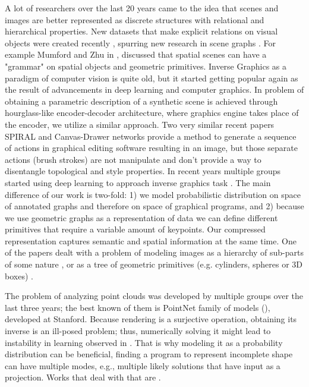 A lot of researchers over the last 20 years came to the idea that scenes and images are better represented as discrete structures with relational and hierarchical properties. 
New datasets that make explicit relations on visual objects were created recently \cite{krishna2017visual}, spurring new research in scene graphs \cite{DBLP:journals/corr/abs-1804-01622,Xu_2017_CVPR}.
For example Mumford and Zhu in \cite{zhu2006stochastic}, discussed that spatial scenes can have a "grammar" on spatial objects and geometric primitives.
Inverse Graphics as a paradigm of computer vision is quite old, but it started getting popular again as the result of advancements in deep learning and computer graphics. In \cite{wu2017neural} problem of obtaining a parametric description of a synthetic scene is achieved through hourglass-like encoder-decoder architecture, where graphics engine takes place of the encoder, we utilize a similar approach.
Two very similar recent papers SPIRAL \cite{pmlr-v80-ganin18a} and Canvas-Drawer networks \cite{frans2018unsupervised} provide a method to generate a sequence of actions in graphical editing software resulting in an image, but those separate actions (brush strokes) are not manipulate and don't provide a way to disentangle topological and style properties. 
In recent years multiple groups started using deep learning to approach inverse graphics task \cite{ellis2018learning,Tulsiani_2017_CVPR}.
The main difference of our work is two-fold: 1) we model probabilistic distribution on space of annotated graphs and therefore on space of graphical programs, and 2) because we use geometric graphs as a representation of data we can define different primitives that require a variable amount of keypoints. Our compressed representation captures semantic and spatial information at the same time.
One of the papers dealt with a problem of modeling images as a hierarchy of sub-parts of some nature  \cite{russell2009associative}, or as a tree of geometric primitives (e.g. cylinders, spheres or 3D boxes) \cite{li2017grass}.

The problem of analyzing point clouds was developed by multiple groups over the last three years; the best known of them is PointNet family of models (\cite{qi2016pointnet,qi2017pointnet++}), developed at Stanford.
Because rendering is a surjective operation, obtaining its inverse is an ill-posed problem; thus, numerically solving it might lead to instability in learning observed in \cite{tian2018learning}. That is why modeling it as a probability distribution can be beneficial, finding a program to represent incomplete shape can have multiple modes, e.g., multiple likely solutions that have input as a projection. Works that deal with that are \cite{kulkarni2014inverse,wu20153d,kulkarni2015picture}.